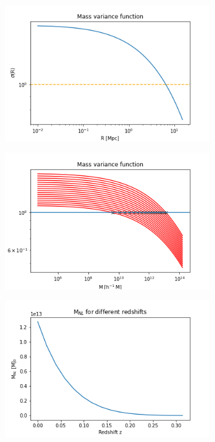 \documentclass[12pt]{article}
\begin{document}
\begin{figure}[ht]
	\centering
	\begin{subfigure}[b]{0.49\textwidth}
		\centering
		\includegraphics[width=\textwidth]{massVariance.png}
	\end{subfigure}
	\hfill
	\begin{subfigure}[b]{0.49\textwidth}
		\centering
		\includegraphics[width=\textwidth]{varianceMNL.png}
	\end{subfigure}
	\begin{subfigure}[b]{0.49\textwidth}
		\centering
		\includegraphics[width=\textwidth]{mnlRedshift.png}

\end{subfigure}
\end{figure}
\end{document}
